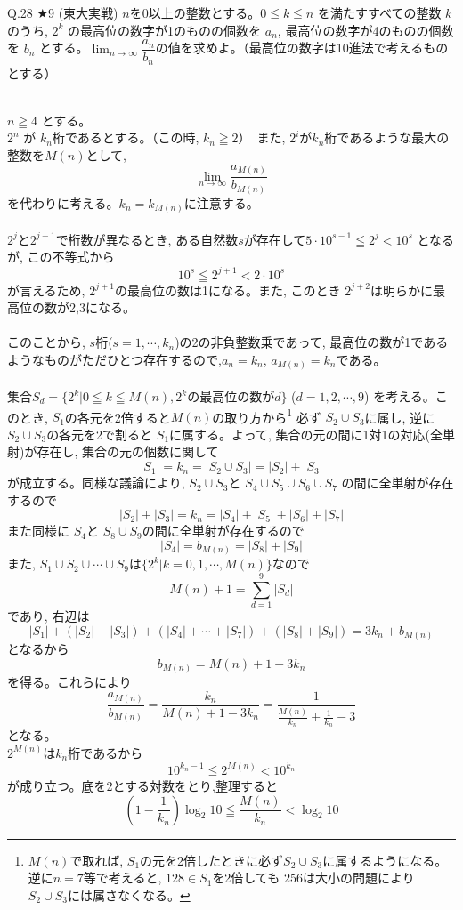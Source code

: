\documentclass[twocolumn]{jsarticle}
\newcommand{\thm}{\begin{itembox}[l]}
\newcommand{\disp}{\displaystyle}
\newcommand{\enthm}{\end{itembox}\\}
\renewcommand{\leq}{\leqq}
\renewcommand{\geq}{\geqq}
\newcommand{\hosi}{$\bigstar$}
\begin{document}
\thm{Q.28 \hosi 9 (東大実戦)}
$n$を0以上の整数とする。$0\leq k\leq n$ を満たすすべての整数 $k$ のうち, $2^k$ の最高位の数字が1のものの個数を $a_n$, 最高位の数字が4のものの個数を $b_n$ とする。$\disp\lim_{n\to \infty} \dfrac{a_n}{b_n}$の値を求めよ。（最高位の数字は10進法で考えるものとする）
\enthm
$n\geq 4$ とする。\\
$2^n$ が $k_n$桁であるとする。（この時, $k_n\geq 2$）　また,  $2^i$が$k_n$桁であるような最大の整数を$M(n)$として,
\[\disp\lim_{n\to \infty} \dfrac{a_{M(n)}}{b_{M(n)}}\]
を代わりに考える。$k_n=k_{M(n)}$に注意する。
\\
\\
$2^{j}$と$2^{j+1}$で桁数が異なるとき, ある自然数$s$が存在して$5\cdot 10^{s-1}\leq 2^j< 10^{s}$ となるが, この不等式から
\[10^{s}\leq 2^{j+1}< 2\cdot 10^{s}\] 
が言えるため, $2^{j+1}$の最高位の数は1になる。また, このとき $2^{j+2}$は明らかに最高位の数が2,3になる。\\
\\
このことから, $s$桁($s=1,\cdots, k_n$)の2の非負整数乗であって, 最高位の数が1であるようなものがただひとつ存在するので,$a_n=k_n$,  $a_{M(n)}=k_{n}$である。\\
\\
集合$S_d=\{ 2^{k} | 0\leq k\leq M(n), 2^k\mbox{の最高位の数が$d$}\}$  ($d=1,2,\cdots ,9$) を考える。このとき, $S_1$の各元を2倍すると$M(n)$の取り方から\footnote{$M(n)$で取れば, $S_1$の元を2倍したときに必ず$S_2\cup S_3$に属するようになる。逆に$n=7$等で考えると, $128\in S_1$を2倍しても $256$は大小の問題により　$S_2\cup S_3$には属さなくなる。}
必ず $S_2\cup S_3$に属し, 逆に $S_2\cup S_3$の各元を2で割ると $S_1$に属する。よって, 集合の元の間に1対1の対応(全単射)が存在し, 集合の元の個数に関して
\[|S_1|=k_n=|S_2\cup S_3|=|S_2|+|S_3|\]
が成立する。同様な議論により, $S_2\cup S_3$と $S_4\cup S_5\cup S_6 \cup S_7$ の間に全単射が存在するので
\[|S_2|+|S_3|=k_n=|S_4|+|S_5|+|S_6|+|S_7|\]
また同様に $S_4$と $S_8\cup S_9$の間に全単射が存在するので
\[|S_4|=b_{M(n)}=|S_8|+|S_9|\]
また, $S_1\cup S_2\cup \cdots \cup S_9$は$\{2^{k}| k=0,1,\cdots , M(n)\}$なので
\[M(n)+1=\disp\sum_{d=1}^9 |S_d|\]
であり, 右辺は
\[|S_1| +(|S_2|+|S_3|)+(|S_4|+\cdots +|S_7|) +(|S_8|+|S_9|)=3k_n+b_{M(n)}\]
となるから 
\[b_{M(n)}=M(n)+1-3k_{n}\]
を得る。これらにより
\[\dfrac{a_{M(n)}}{b_{M(n)}}=\dfrac{k_n}{M(n)+1-3k_{n}}=\dfrac{1}{\frac{M(n)}{k_n} +\frac{1}{k_n}-3}\]
となる。\\
$2^{M(n)}$は$k_n$桁であるから
\[10^{k_n-1}\leq 2^{M(n)}<10^{k_n}\]
が成り立つ。底を2とする対数をとり,整理すると
\[\left(1- \dfrac{1}{k_n}\right)\log_2{10}\leq \dfrac{M(n)}{k_n} < \log_2{10} \]
\end{document}
